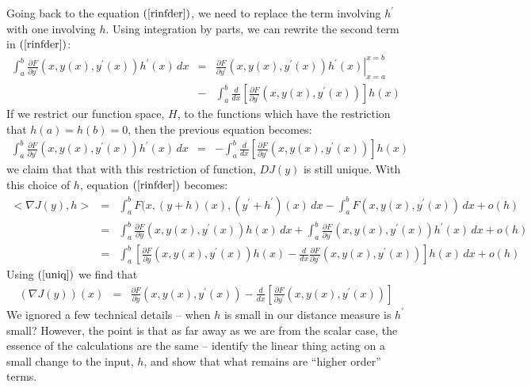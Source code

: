 \documentclass{article}
\begin{document}
Going back to the equation $(\ref{rinfder})$, we need to replace the term involving
$h^\prime$ with one involving $h$. Using integration by parts, we can rewrite the
second term in $(\ref{rinfder})$:
\begin{eqnarray}
\int_a^b \frac{\partial F}{\partial y^\prime}(x, y(x), y^\prime(x))h^\prime(x) \, dx
& = &
\left. \frac{\partial F}{\partial y^\prime}(x, y(x), y^\prime(x))
  h^\prime(x)\right|_{x=a}^{x=b} \nonumber \\
& - & \int_a^b \frac{d}{dx}
\left[
  \frac{\partial F}{\partial y^\prime}(x, y(x), y^\prime(x))
  \right]
  h(x)
\end{eqnarray}
If we restrict our function space, $H$, to the functions
which have the restriction that $h(a) = h(b) = 0$, then
the previous equation becomes:
\begin{eqnarray}
\int_a^b \frac{\partial F}{\partial y^\prime}(x, y(x), y^\prime(x))h^\prime(x) \, dx
& = &  - \int_a^b \frac{d}{dx}
\left[
  \frac{\partial F}{\partial y^\prime}(x, y(x), y^\prime(x))
  \right]
  h(x)
\end{eqnarray}
we claim that that with this restriction of function, $DJ(y)$ is still unique.
With this choice of $h$,
equation $(\ref{rinfder})$ becomes:
\begin{eqnarray}
  <\!\nabla J(y), h\!>  & = & \int_a^b F(x, (y+h)(x), (y^\prime + h^\prime)(x) \, dx
  - \int_a^b F(x, y(x), y^\prime(x)) \, dx  + o(h) \nonumber \\
  & = & \int_a^b \frac{\partial F}{\partial y}(x, y(x), y^\prime(x))h(x)\, dx
+ \int_a^b \frac{\partial F}{\partial y^\prime}(x, y(x), y^\prime(x))h^\prime(x) \, dx
+ o(h) \nonumber \\
& = & \int_a^b \left[ \frac{\partial F}{\partial y}(x, y(x), y^\prime(x))h(x) -
\frac{d}{dx}\frac{\partial F}{\partial y^\prime}(x, y(x), y^\prime(x))\right]h(x)\, dx
+ o(h)
\end{eqnarray}
Using $(\ref{uniq})$ we find that
\begin{eqnarray}
  (\nabla J(y))(x) & = & \frac{\partial F}{\partial y}(x, y(x), y^\prime(x))
  - \frac{d}{dx} \left[ \frac{\partial F}{\partial y^\prime}(x, y(x), y^\prime(x))\right]
                         \label{risz_rep2}
\end{eqnarray}
We ignored a few technical details -- when $h$ is small in our distance measure is
$h^\prime$ small? However, the point is that as far away as we are from the scalar
case, the essence of the calculations are the same -- identify the linear thing
acting on a small change to the input, $h$, and show that what remains are
``higher order''{} terms.
\end{document}
